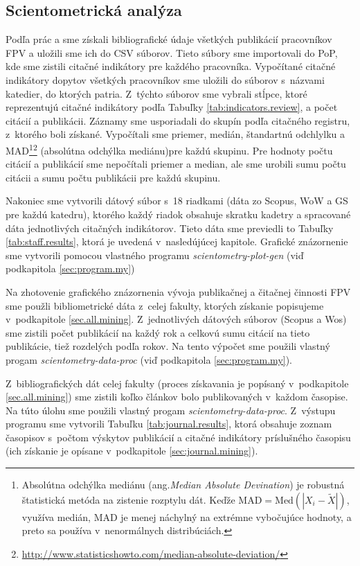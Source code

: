 \subsection{Scientometrická analýza}

Podľa prác \citet{Kazakis2014a} a \citet{Kazakis2014b,Kazakis2015} sme získali
bibliografické údaje všetkých publikácií pracovníkov FPV a uložili sme ich do
CSV súborov. Tieto súbory sme importovali do PoP, kde sme zistili citačné
indikátory pre každého pracovníka. Vypočítané citačné indikátory dopytov
všetkých pracovníkov sme uložili do súborov s~názvami katedier, do ktorých
patria. Z~týchto súborov sme vybrali stĺpce, ktoré reprezentujú citačné
indikátory podľa Tabuľky \ref{tab:indicators.review}, a počet citácií a
publikácii.  Záznamy sme usporiadali do skupín podľa citačného registru,
z~ktorého boli získané.  Vypočítali sme priemer, medián, štandartnú odchlylku a
MAD\footnote{Absolútna odchýlka mediánu (ang.\emph{Median Absolute Devination})
je robustná štatistická metóda na zistenie rozptylu dát. Keďže $\mathrm{MAD} =
\mathrm{Med}(|X_i - \tilde{X}|)$, využíva medián, MAD je menej náchylný na
extrémne vybočujúce hodnoty, a preto sa používa v~nenormálnych
distribúciách.}\footnote{\url{http://www.statisticshowto.com/median-absolute-deviation/}}
(absolútna odchýlka mediánu)pre každú skupinu. Pre hodnoty počtu citácií a
publikácií sme nepočítali priemer a median, ale sme urobili sumu počtu citácii
a sumu počtu publikácii pre každú skupinu.

Nakoniec sme vytvorili dátový súbor s~18 riadkami (dáta zo Scopus, WoW a GS pre
každú katedru), ktorého každý riadok obsahuje skratku kadetry a spracované dáta
jednotlivých citačných indikátorov.  Tieto dáta sme previedli to Tabuľky
\ref{tab:staff.results}, ktorá je uvedená v~nasledújúcej kapitole. Grafické
znázornenie sme vytvorili pomocou vlastného programu
\emph{scientometry-plot-gen} (viď podkapitola \ref{sec:program.my})

Na zhotovenie grafického znázornenia vývoja publikačnej a čitačnej činnosti FPV
sme použli bibliometrické dáta z~celej fakulty, ktorých získanie popisujeme
v~podkapitole \ref{sec.all.mining}. Z~jednotlivých dátových súborov (Scopus a
Wos) sme zistili počet publikácií na každý rok  a celkovú sumu citácií na tieto
publikácie, tiež rozdelých podľa rokov. Na tento výpočet sme použili vlastný
progam \emph{scientometry-data-proc} (viď podkapitola \ref{sec:program.my}).

Z~bibliografických dát celej fakulty (proces získavania je popísaný
v~podkapitole \ref{sec.all.mining}) sme zistili koľko článkov bolo
publikovaných v~každom časopise.  Na túto úlohu sme použili vlastný progam
\emph{scientometry-data-proc}. Z~výstupu programu sme vytvorili  Tabuľku
\ref{tab:journal.results}, ktorá obsahuje zoznam časopisov s~počtom výskytov
publikácií a citačné indikátory príslušného časopisu (ich získanie je opísane
v~podkapitole \ref{sec:journal.mining}). 

